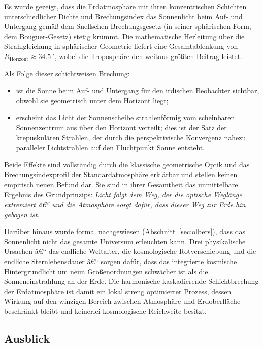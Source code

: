 ﻿\documentclass[12pt,a4paper]{article}
\begin{document}
Es wurde gezeigt, dass die Erdatmosphäre mit ihren konzentrischen
Schichten unterschiedlicher Dichte und Brechungsindex das Sonnenlicht
beim Auf- und Untergang gemäß dem Snellschen Brechungsgesetz
(in seiner sphärischen Form, dem Bouguer-Gesetz) stetig krümmt.
Die mathematische Herleitung über die Strahlgleichung in
sphärischer Geometrie liefert eine Gesamtablenkung von
$R_{\mathrm{Horizont}} \approx \SI{34.5}{\arcminute}$,
wobei die Troposphäre den weitaus größten Beitrag leistet.

Als Folge dieser schichtweisen Brechung:
\begin{itemize}
  \item ist die Sonne beim Auf- und Untergang für den irdischen
        Beobachter sichtbar, obwohl sie geometrisch un\-ter dem
        Horizont liegt;
  \item erscheint das Licht der Sonnenscheibe strahlenförmig
        vom scheinbaren Sonnenzentrum aus über den Horizont
        verteilt; dies ist der Satz der krepuskulären Strahlen,
        der durch die perspektivische Konvergenz nahezu paralleler
        Lichtstrahlen auf den Fluchtpunkt Sonne entsteht.
\end{itemize}

Beide Effekte sind vollständig durch die klassische geometrische Optik
und das Brechungsindexprofil der Standardatmosphäre erklärbar
und stellen keinen empirisch neuen Befund dar.
Sie sind in ihrer Gesamtheit das unmittelbare Ergebnis des
Grundprinzips: \emph{Licht folgt dem Weg, der die optische
Weglänge extremiert â€“ und die Atmosphäre sorgt dafür, dass dieser
Weg zur Erde hin gebogen ist.}

Darüber hinaus wurde formal nachgewiesen (Abschnitt~\ref{sec:olbers}),
dass das Sonnenlicht nicht das gesamte Universum erleuchten kann.
Drei physikalische Ursachen â€“ das endliche Weltalter, die
kosmologische Rotverschiebung und die endliche Sternlebensdauer â€“
sorgen dafür, dass das integrierte kosmische Hintergrundlicht
um neun Größenordnungen schwächer ist als die Sonneneinstrahlung
an der Erde.
Die harmonische kaskadierende Schichtbrechung der Erdatmosphäre
ist damit ein lokal streng optimierter Prozess, dessen Wirkung
auf den winzigen Bereich zwischen Atmosphäre und Erdoberfläche
beschränkt bleibt und keinerlei kosmologische Reichweite besitzt.

\subsection{Ausblick}
\end{document}
